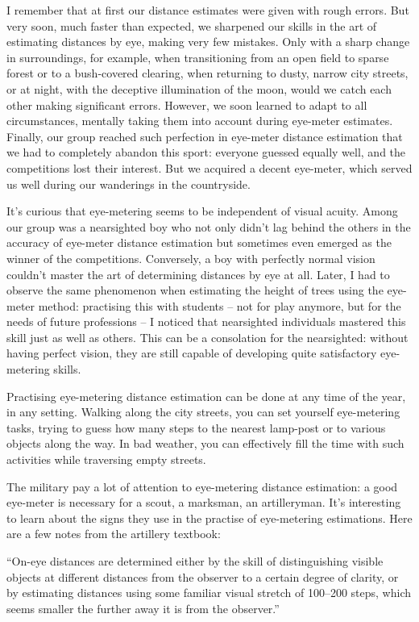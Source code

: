 I remember that at first our distance estimates were given with rough errors. But very soon, much faster than expected, we sharpened our skills in the art of estimating distances by eye, making very few mistakes. Only with a sharp change in surroundings, for example, when transitioning from an open field to sparse forest or to a bush-covered clearing, when returning to dusty, narrow city streets, or at night, with the deceptive illumination of the moon, would we catch each other making significant errors. However, we soon learned to adapt to all circumstances, mentally taking them into account during eye-meter estimates. Finally, our group reached such perfection in eye-meter distance estimation that we had to completely abandon this sport: everyone guessed equally well, and the competitions lost their interest. But we acquired a decent eye-meter, which served us well during our wanderings in the countryside.

It's curious that eye-metering seems to be independent of visual acuity. Among our group was a nearsighted boy who not only didn't lag behind the others in the accuracy of eye-meter distance estimation but sometimes even emerged as the winner of the competitions. Conversely, a boy with perfectly normal vision couldn't master the art of determining distances by eye at all. Later, I had to observe the same phenomenon when estimating the height of trees using the eye-meter method: practising this with students -- not for play anymore, but for the needs of future professions -- I noticed that nearsighted individuals mastered this skill just as well as others. This can be a consolation for the nearsighted: without having perfect vision, they are still capable of developing quite satisfactory eye-metering skills.

Practising eye-metering distance estimation can be done at any time of the year, in any setting. Walking along the city streets, you can set yourself eye-metering tasks, trying to guess how many steps to the nearest lamp-post or to various objects along the way. In bad weather, you can effectively fill the time with such activities while traversing empty streets.

The military pay a lot of attention to eye-metering distance estimation: a good eye-meter is necessary for a scout, a marksman, an artilleryman. It's interesting to learn about the signs they use in the practise of eye-metering estimations. Here are a few notes from the artillery textbook:

``On-eye distances are determined either by the skill of distinguishing visible objects at different distances from the observer to a certain degree of clarity, or by estimating distances using some familiar visual stretch of 100–200 steps, which seems smaller the further away it is from the observer.''

